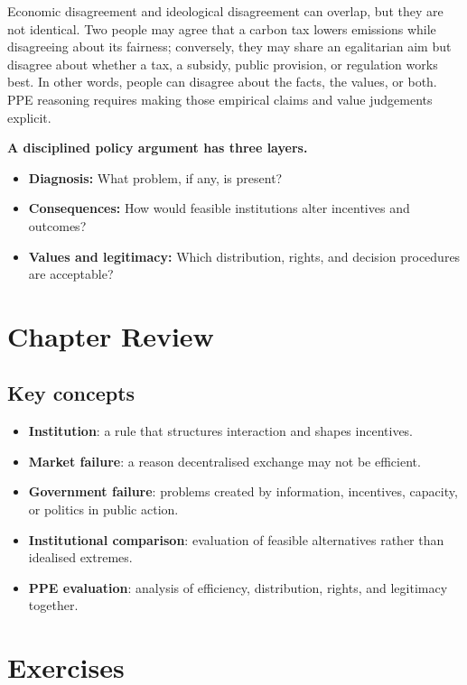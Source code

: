 Economic disagreement and ideological disagreement can overlap, but they are
not identical. Two people may agree that a carbon tax lowers emissions while
disagreeing about its fairness; conversely, they may share an egalitarian aim
but disagree about whether a tax, a subsidy, public provision, or regulation
works best. In other words, people can disagree about the facts, the values,
or both. PPE reasoning requires making those empirical claims and value
judgements explicit.

\begin{keyidea}
\textbf{A disciplined policy argument has three layers.}
\begin{itemize}
  \item \textbf{Diagnosis:} What problem, if any, is present?
  \item \textbf{Consequences:} How would feasible institutions alter incentives and outcomes?
  \item \textbf{Values and legitimacy:} Which distribution, rights, and decision procedures are acceptable?
\end{itemize}
\end{keyidea}

\section*{Chapter Review}

\subsection*{Key concepts}
\begin{itemize}
  \item \textbf{Institution}: a rule that structures interaction and shapes incentives.
  \item \textbf{Market failure}: a reason decentralised exchange may not be efficient.
  \item \textbf{Government failure}: problems created by information, incentives, capacity, or politics in public action.
  \item \textbf{Institutional comparison}: evaluation of feasible alternatives rather than idealised extremes.
  \item \textbf{PPE evaluation}: analysis of efficiency, distribution, rights, and legitimacy together.
\end{itemize}

\section*{Exercises}

